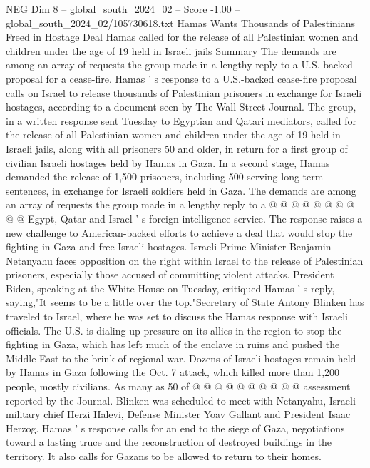 \begin{textsample}{NEG Dim 8 – global\_south\_2024\_02 – Score -1.00 – global\_south\_2024\_02/105730618.txt}  \label{ex:f8_neg_062}
Hamas Wants Thousands of Palestinians Freed in Hostage Deal Hamas called for the release of all Palestinian women and children under the age of 19 held in Israeli jails Summary The demands are among an array of requests the group made in a lengthy reply to a U.S.-backed proposal for a cease-fire.
Hamas ' s response to a U.S.-backed cease-fire proposal calls on Israel to release thousands of Palestinian prisoners in exchange for Israeli hostages, according to a document seen by The Wall Street Journal.
The group, in a written response sent Tuesday to Egyptian and Qatari mediators, called for the release of all Palestinian women and children under the age of 19 held in Israeli jails, along with all prisoners 50 and older, in return for a first group of civilian Israeli hostages held by Hamas in Gaza.
In a second stage, Hamas demanded the release of 1,500 prisoners, including 500 serving long-term sentences, in exchange for Israeli soldiers held in Gaza.
The demands are among an array of requests the group made in a lengthy reply to a @ @ @ @ @ @ @ @ @ @ Egypt, Qatar and Israel ' s foreign intelligence service.
The response raises a new challenge to American-backed efforts to achieve a deal that would stop the fighting in Gaza and free Israeli hostages.
Israeli Prime Minister Benjamin Netanyahu faces opposition on the right within Israel to the release of Palestinian prisoners, especially those accused of committing violent attacks.
President Biden, speaking at the White House on Tuesday, critiqued Hamas ' s reply, saying,"It seems to be a little over the top."Secretary of State Antony Blinken has traveled to Israel, where he was set to discuss the Hamas response with Israeli officials.
The U.S. is dialing up pressure on its allies in the region to stop the fighting in Gaza, which has left much of the enclave in ruins and pushed the Middle East to the brink of regional war.
Dozens of Israeli hostages remain held by Hamas in Gaza following the Oct. 7 attack, which killed more than 1,200 people, mostly civilians.
As many as 50 of @ @ @ @ @ @ @ @ @ @ assessment reported by the Journal.
Blinken was scheduled to meet with Netanyahu, Israeli military chief Herzi Halevi, Defense Minister Yoav Gallant and President Isaac Herzog.
Hamas ' s response calls for an end to the siege of Gaza, negotiations toward a lasting truce and the reconstruction of destroyed buildings in the territory.
It also calls for Gazans to be allowed to return to their homes.

\end{textsample}
